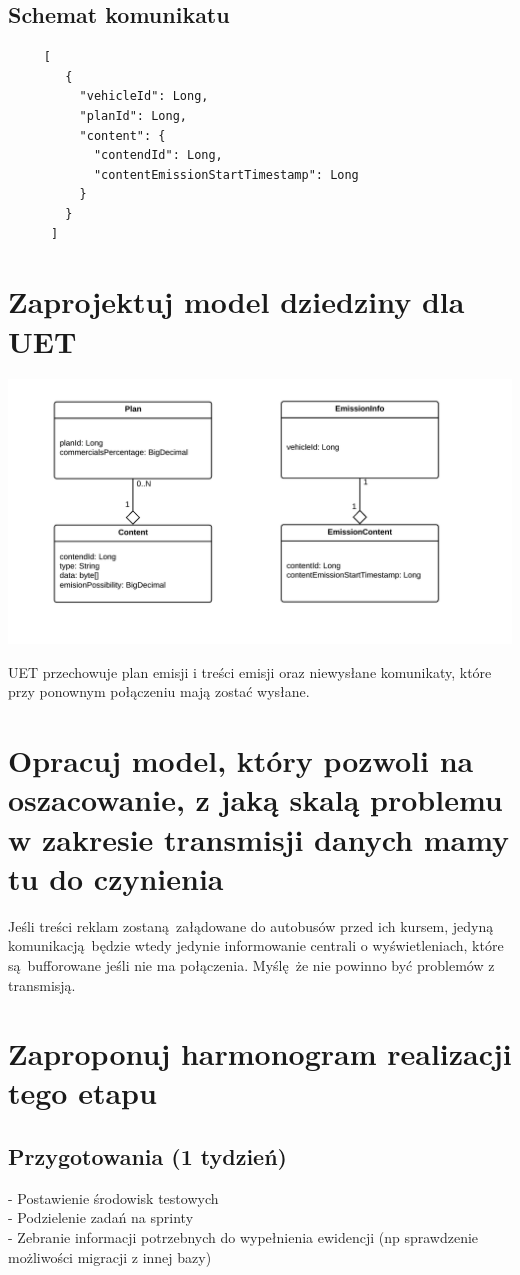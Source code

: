 \documentclass{article}
\begin{document}
    \subsection{Schemat komunikatu}
     \begin{lstlisting}
     [
        {
          "vehicleId": Long,
          "planId": Long,
          "content": {
            "contendId": Long,
            "contentEmissionStartTimestamp": Long
          }
        }
      ]
     \end{lstlisting}


  \newpage
  \section{Zaprojektuj model dziedziny dla UET}
     \includegraphics[width=\textwidth]{baza}

     UET przechowuje plan emisji i treści emisji oraz niewysłane komunikaty, które przy ponownym połączeniu mają zostać wysłane.


  \newpage
  \section{Opracuj model, który pozwoli na oszacowanie, z jaką skalą problemu w zakresie transmisji danych mamy tu do czynienia}
    Jeśli treści reklam zostaną załądowane do autobusów przed ich kursem, jedyną komunikacją będzie wtedy jedynie informowanie centrali o wyświetleniach, które są bufforowane jeśli nie ma połączenia. Myślę że nie powinno być problemów z transmisją.


  \newpage
  \section{Zaproponuj harmonogram realizacji tego etapu}
    \subsection{Przygotowania (1 tydzień)}
      - Postawienie środowisk testowych \\
      - Podzielenie zadań na sprinty \\
      - Zebranie informacji potrzebnych do wypełnienia ewidencji (np sprawdzenie możliwości migracji z innej bazy)
\end{document}
